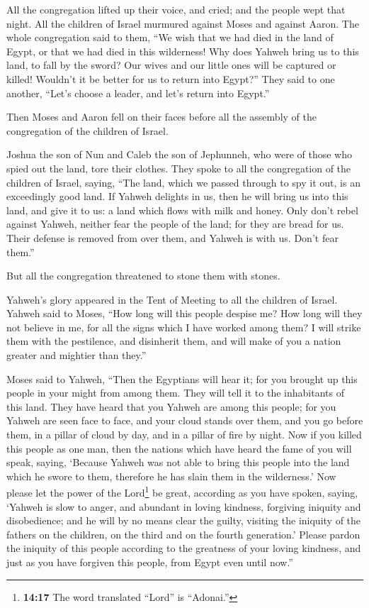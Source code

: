  All the congregation lifted up their voice, and cried;
and the people wept that night.  All the children of
Israel murmured against Moses and against Aaron. The whole congregation
said to them, ``We wish that we had died in the land of Egypt, or that
we had died in this wilderness!  Why does Yahweh bring us
to this land, to fall by the sword? Our wives and our little ones will
be captured or killed! Wouldn't it be better for us to return into
Egypt?''  They said to one another, ``Let's choose a
leader, and let's return into Egypt.''

 Then Moses and Aaron fell on their faces before all the
assembly of the congregation of the children of Israel.

 Joshua the son of Nun and Caleb the son of Jephunneh, who
were of those who spied out the land, tore their clothes. 
They spoke to all the congregation of the children of Israel, saying,
``The land, which we passed through to spy it out, is an exceedingly
good land.  If Yahweh delights in us, then he will bring
us into this land, and give it to us: a land which flows with milk and
honey.  Only don't rebel against Yahweh, neither fear the
people of the land; for they are bread for us. Their defense is removed
from over them, and Yahweh is with us. Don't fear them.''

 But all the congregation threatened to stone them with
stones.

Yahweh's glory appeared in the Tent of Meeting to all the children of
Israel.  Yahweh said to Moses, ``How long will this
people despise me? How long will they not believe in me, for all the
signs which I have worked among them?  I will strike them
with the pestilence, and disinherit them, and will make of you a nation
greater and mightier than they.''

 Moses said to Yahweh, ``Then the Egyptians will hear it;
for you brought up this people in your might from among them.
 They will tell it to the inhabitants of this land. They
have heard that you Yahweh are among this people; for you Yahweh are
seen face to face, and your cloud stands over them, and you go before
them, in a pillar of cloud by day, and in a pillar of fire by night.
 Now if you killed this people as one man, then the
nations which have heard the fame of you will speak, saying,
 `Because Yahweh was not able to bring this people into
the land which he swore to them, therefore he has slain them in the
wilderness.'  Now please let the power of the
Lord\footnote{\textbf{14:17} The word translated ``Lord'' is ``Adonai.''}
be great, according as you have spoken, saying,  `Yahweh
is slow to anger, and abundant in loving kindness, forgiving iniquity
and disobedience; and he will by no means clear the guilty, visiting the
iniquity of the fathers on the children, on the third and on the fourth
generation.'  Please pardon the iniquity of this people
according to the greatness of your loving kindness, and just as you have
forgiven this people, from Egypt even until now.''

